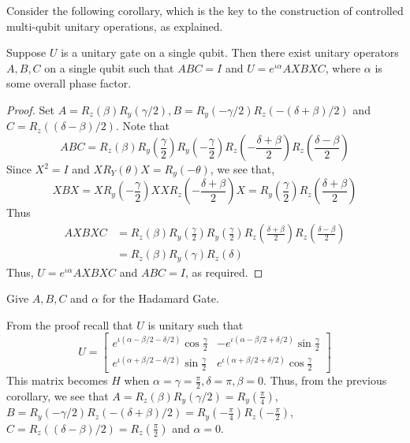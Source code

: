 Consider the following corollary, which is the key to the construction of controlled multi-qubit unitary operations, as explained.

\begin{corollary}
    Suppose $U$ is a unitary gate on a single qubit. Then there exist unitary operators $A,B,C$ on a single qubit such that $ABC=I$ and $U=e^{\iota \alpha}AXBXC$, where $\alpha$ is some overall phase factor.
\end{corollary}
\begin{proof}
    Set $A=R_z(\beta)R_y(\gamma/2), B=R_y(-\gamma/2)R_z(-(\delta+\beta)/2)$ and $C=R_z((\delta-\beta)/2)$. Note that
    \[
    ABC=R_z(\beta)R_y\left(\frac{\gamma}{2}\right)R_y\left(-\frac{\gamma}{2}\right)R_z\left(-\frac{\delta+\beta}{2}\right)R_z\left(\frac{\delta-\beta}{2}\right)
    \]
    Since $X^2=I$ and $XR_Y(\theta)X=R_y(-\theta)$, we see that,
    \[
    XBX=XR_y\left(-\frac{\gamma}{2}\right)XXR_z\left(-\frac{\delta+\beta}{2}\right)X=R_y\left(\frac{\gamma}{2}\right)R_z\left(\frac{\delta+\beta}{2}\right)
    \]
    Thus
    \begin{align*}
    AXBXC&=R_z(\beta)R_y\left(\frac{\gamma}{2}\right)R_y\left(\frac{\gamma}{2}\right)R_z\left(\frac{\delta+\beta}{2}\right)R_z\left(\frac{\delta-\beta}{2}\right)\\
    &=R_z(\beta)R_y(\gamma)R_z(\delta)
    \end{align*}
    Thus, $U=e^{\iota\alpha}AXBXC$ and $ABC=I$, as required.
\end{proof}

\begin{example}
    Give $A,B,C$ and $\alpha$ for the Hadamard Gate.

    From the proof recall that $U$ is unitary such that
    \[
    U=\begin{bmatrix} e^{\iota (\alpha - \beta/2 -\delta/2)} \cos \frac{\gamma}{2} & -e^{\iota (\alpha-\beta/2+\delta/2)}\sin\frac{\gamma}{2}\\
    e^{\iota (\alpha+\beta/2-\delta/2)}\sin\frac{\gamma}{2} & e^{\iota(\alpha+\beta/2+\delta/2)}\cos \frac{\gamma}{2} \end{bmatrix}
    \]
    This matrix becomes $H$ when $\alpha=\gamma=\frac{\pi}{2},\delta=\pi,\beta=0$. Thus, from the previous corollary, we see that $A=R_z(\beta)R_y(\gamma/2)=R_y\left(\frac{\pi}{4}\right)$, $B=R_y(-\gamma/2)R_z(-(\delta+\beta)/2)=R_y\left(-\frac{\pi}{4}\right)R_z\left(-\frac{\pi}{2}\right)$, $C=R_z((\delta-\beta)/2)=R_z\left(\frac{\pi}{2}\right)$ and $\alpha=0$.
\end{example}


